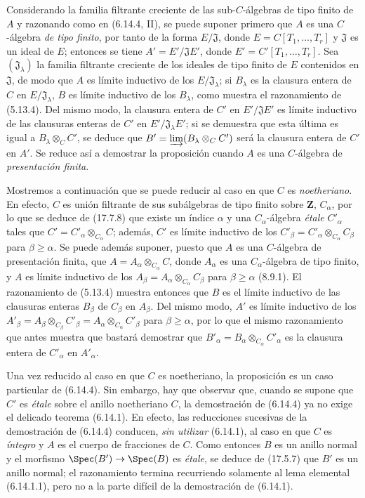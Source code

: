 Considerando la familia filtrante creciente de las sub-$C$-álgebras de tipo finito de $A$ y razonando como en (6.14.4, II), se puede suponer primero que $A$ es una $C$-álgebra \emph{de tipo finito}, por tanto de la forma $E/\mathfrak J$, donde $E=C[T_1,\ldots,T_r]$ y $\mathfrak J$ es un ideal de $E$; entonces se tiene $A'=E'/\mathfrak JE'$, donde $E'=C'[T_1,\ldots,T_r]$. Sea $(\mathfrak J_\lambda)$ la familia filtrante creciente de los ideales de tipo finito de $E$ contenidos en $\mathfrak J$, de modo que $A$ es límite inductivo de los $E/\mathfrak J_\lambda$; si $B_\lambda$ es la clausura entera de $C$ en $E/\mathfrak J_\lambda$, $B$ es límite inductivo de los $B_\lambda$, como muestra el razonamiento de (5.13.4). Del mismo modo, la clausura entera de $C'$ en $E'/\mathfrak JE'$ es límite inductivo de las clausuras enteras de $C'$ en $E'/\mathfrak J_\lambda E'$; si se demuestra que esta última es igual a $B_\lambda\otimes_C C'$, se deduce que
$B'=\varinjlim(B_\lambda\otimes_C C')$
será la clausura entera de $C'$ en $A'$. Se reduce así a demostrar la proposición cuando $A$ es una $C$-álgebra de \emph{presentación finita}.

Mostremos a continuación que se puede reducir al caso en que $C$ es \emph{noetheriano}. En efecto, $C$ es unión filtrante de sus subálgebras de tipo finito sobre $\mathbf Z$, $C_\alpha$, por lo que se deduce de (17.7.8) que existe un índice $\alpha$ y una $C_\alpha$-álgebra \emph{étale} $C'_\alpha$ tales que $C'=C'_\alpha\otimes_{C_\alpha}C$; además, $C'$ es límite inductivo de los $C'_\beta=C'_\alpha\otimes_{C_\alpha}C_\beta$ para $\beta\geq\alpha$. Se puede además suponer, puesto que $A$ es una $C$-álgebra de presentación finita, que $A=A_\alpha\otimes_{C_\alpha}C$, donde $A_\alpha$ es una $C_\alpha$-álgebra de tipo finito, y $A$ es límite inductivo de los $A_\beta=A_\alpha\otimes_{C_\alpha}C_\beta$ para $\beta\geq\alpha$ (8.9.1). El razonamiento de (5.13.4) muestra entonces que $B$ es el límite inductivo de las clausuras enteras $B_\beta$ de $C_\beta$ en $A_\beta$. Del mismo modo, $A'$ es límite inductivo de los
$A'_\beta=A_\beta\otimes_{C_\beta}C'_\beta=A_\alpha\otimes_{C_\alpha}C'_\beta$
para $\beta\geq\alpha$, por lo que el mismo razonamiento que antes muestra que bastará demostrar que $B'_\alpha=B_\alpha\otimes_{C_\alpha}C'_\alpha$ es la clausura entera de $C'_\alpha$ en $A'_\alpha$.

Una vez reducido al caso en que $C$ es noetheriano, la proposición es un caso particular de (6.14.4). Sin embargo, hay que observar que, cuando se supone que $C'$ es \emph{étale} sobre el anillo noetheriano $C$, la demostración de (6.14.4) ya no exige el delicado teorema (6.14.1). En efecto, las reducciones sucesivas de la demostración de (6.14.4) conducen, \emph{sin utilizar} (6.14.1), al caso en que $C$ es \emph{íntegro} y $A$ es el cuerpo de fracciones de $C$. Como entonces $B$ es un anillo normal y el morfismo $\Spec(B')\to\Spec(B)$ es \emph{étale}, se deduce de (17.5.7) que $B'$ es un anillo normal; el razonamiento termina recurriendo solamente al lema elemental (6.14.1.1), pero no a la parte difícil de la demostración de (6.14.1).

